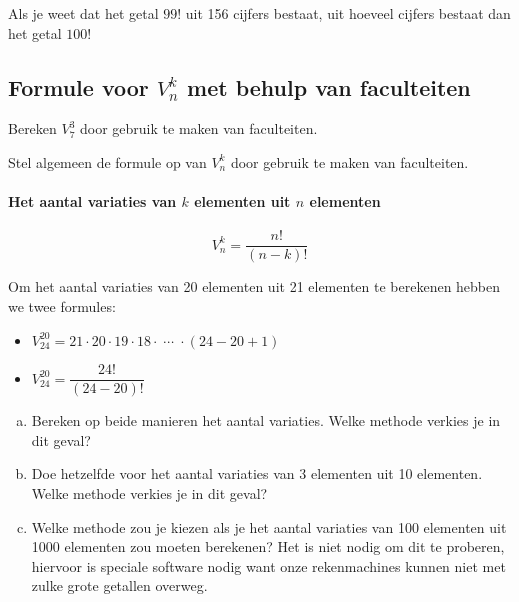 \documentclass[12pt,twoside]{article}
\begin{document}
\begin{oefening}
Als je weet dat het getal $99!$ uit 156 cijfers bestaat, uit hoeveel cijfers bestaat dan het getal $100!$
\end{oefening}

\begin{cursus}

\pagebreak
\subsection{Formule voor $V^k_n$ met behulp van faculteiten}

Bereken $V^3_7$ door gebruik te maken van faculteiten.

Stel algemeen de formule op van $V^k_n$ door gebruik te maken van faculteiten.

\paragraph*{Het aantal variaties van $k$ elementen uit $n$ elementen}
\begin{mdframed}
$$V^k_n=\dfrac{n!}{(n-k)!}$$
\end{mdframed}

\end{cursus}

\begin{oefening}
Om het aantal variaties van 20 elementen uit 21 elementen te berekenen hebben we twee formules:\\
\begin{itemize}
  \itemsep1em
  \item $\displaystyle V^{20}_{24}=21\cdot20\cdot19\cdot18\cdot\;\cdots\;\cdot(24-20+1)$
  \item $\displaystyle V^{20}_{24}=\dfrac{24!}{(24-20)!}$
\end{itemize}
\begin{enumerate}[(a)]
  \item Bereken op beide manieren het aantal variaties. Welke methode verkies je in dit geval?
  \item Doe hetzelfde voor het aantal variaties van 3 elementen uit 10 elementen. Welke methode verkies je in dit geval?
  \item Welke methode zou je kiezen als je het aantal variaties van 100 elementen uit 1000 elementen zou moeten berekenen? Het is niet nodig om dit te proberen, hiervoor is speciale software nodig want onze rekenmachines kunnen niet met zulke grote getallen overweg.
\end{enumerate}

\end{oefening}
\end{document}
